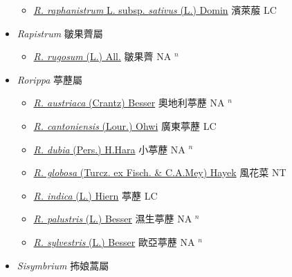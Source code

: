 \begin{itemize}
  \begin{itemize}
        \item[] \href{http://www.theplantlist.org/tpl1.1/search?q=Raphanus+raphanistrum+subsp.+sativus}{\textit{R. raphanistrum} L. subsp. \textit{sativus} (L.) Domin}     濱萊菔 LC
  \end{itemize}
 \item[] \textit{Rapistrum} 皺果薺屬
                    
  \begin{itemize}
        \item[] \href{http://www.theplantlist.org/tpl1.1/search?q=Rapistrum+rugosum}{\textit{R. rugosum} (L.) All.}   皺果薺 NA $^n$
  \end{itemize}
 \item[] \textit{Rorippa} 葶藶屬
                    
  \begin{itemize}
        \item[] \href{http://www.theplantlist.org/tpl1.1/search?q=Rorippa+austriaca}{\textit{R. austriaca} (Crantz) Besser}   奧地利葶藶 NA $^n$
        \item[] \href{http://www.theplantlist.org/tpl1.1/search?q=Rorippa+cantoniensis}{\textit{R. cantoniensis} (Lour.) Ohwi}   廣東葶藶 LC
        \item[] \href{http://www.theplantlist.org/tpl1.1/search?q=Rorippa+dubia}{\textit{R. dubia} (Pers.) H.Hara}   小葶藶 NA $^n$
        \item[] \href{http://www.theplantlist.org/tpl1.1/search?q=Rorippa+globosa}{\textit{R. globosa} (Turcz. ex Fisch. \& C.A.Mey) Hayek}   風花菜 NT
        \item[] \href{http://www.theplantlist.org/tpl1.1/search?q=Rorippa+indica}{\textit{R. indica} (L.) Hiern}   葶藶 LC
        \item[] \href{http://www.theplantlist.org/tpl1.1/search?q=Rorippa+palustris}{\textit{R. palustris} (L.) Besser}   濕生葶藶 NA $^n$
        \item[] \href{http://www.theplantlist.org/tpl1.1/search?q=Rorippa+sylvestris}{\textit{R. sylvestris} (L.) Besser}   歐亞葶藶 NA $^n$
  \end{itemize}
 \item[] \textit{Sisymbrium} 抪娘蒿屬
                    

\end{itemize}
